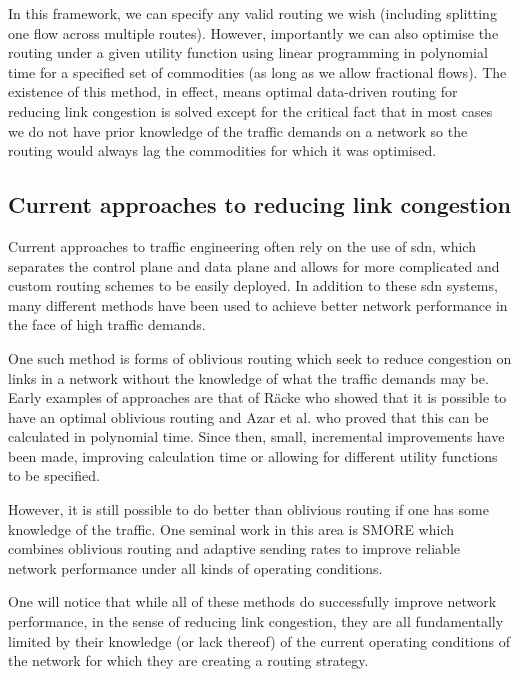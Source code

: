In this framework, we can specify any valid routing we wish (including splitting one flow across multiple routes). However, importantly we can also optimise the routing under a given utility function using linear programming in polynomial time for a specified set of commodities (as long as we allow fractional flows)\cite{cormen2009introduction}. The existence of this method, in effect, means optimal data-driven routing for reducing link congestion is solved except for the critical fact that in most cases we do not have prior knowledge of the traffic demands on a network so the routing would always lag the commodities for which it was optimised.

\subsection{Current approaches to reducing link congestion}

Current approaches to traffic engineering often rely on the use of \ac{sdn}, which separates the control plane and data plane and allows for more complicated and custom routing schemes to be easily deployed\cite{doi:10.1002/sec.1737}. In addition to these \ac{sdn} systems, many different methods have been used to achieve better network performance in the face of high traffic demands.

One such method is forms of oblivious routing\cite{Bansal2008} which seek to reduce congestion on links in a network without the knowledge of what the traffic demands may be. Early examples of approaches are that of R\"acke\cite{racke2002minimizing} who showed that it is possible to have an optimal oblivious routing and Azar et al.\cite{azar2004optimal} who proved that this can be calculated in polynomial time. Since then, small, incremental improvements have been made, improving calculation time or allowing for different utility functions to be specified\cite{kodialam2008advances}.

However, it is still possible to do better than oblivious routing if one has some knowledge of the traffic. One seminal work in this area is SMORE\cite{kumar2018semi} which combines oblivious routing and adaptive sending rates to improve reliable network performance under all kinds of operating conditions.

One will notice that while all of these methods do successfully improve network performance, in the sense of reducing link congestion, they are all fundamentally limited by their knowledge (or lack thereof) of the current operating conditions of the network for which they are creating a routing strategy. 


